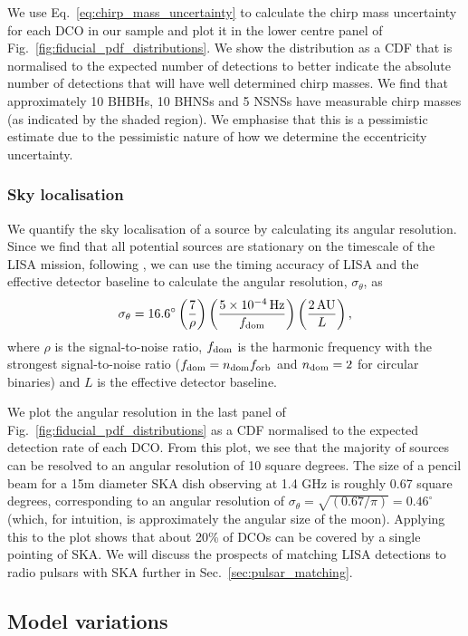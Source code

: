 We use Eq.~\ref{eq:chirp_mass_uncertainty} to calculate the chirp mass uncertainty for each DCO in our sample and plot it in the lower centre panel of Fig.~\ref{fig:fiducial_pdf_distributions}. We show the distribution as a CDF that is normalised to the expected number of detections to better indicate the absolute number of detections that will have well determined chirp masses. We find that approximately 10 BHBHs, 10 BHNSs and 5 NSNSs have measurable chirp masses (as indicated by the shaded region). We emphasise that this is a pessimistic estimate due to the pessimistic nature of how we determine the eccentricity uncertainty.

\subsubsection{Sky localisation}
We quantify the sky localisation of a source by calculating its angular resolution. Since we find that all potential sources are stationary on the timescale of the LISA mission, following \citet{Mandel+2018}, we can use the timing accuracy of LISA and the effective detector baseline to calculate the angular resolution, $\sigma_{\theta}$, as
\begin{equation}
    \sigma_{\theta} = 16.6^\circ \left(\frac{7}{\rho}\right) \left(\frac{5 \times 10^{-4} \unit{Hz}}{f_{\rm dom}}\right) \left( \frac{2 \unit{AU}}{L} \right),
\end{equation}
where $\rho$ is the signal-to-noise ratio, $f_{\rm dom}$ is the harmonic frequency with the strongest signal-to-noise ratio ($f_{\rm dom} = n_{\rm dom} f_{\rm orb}$ and $n_{\rm dom} = 2$ for circular binaries) and $L$ is the effective detector baseline.

We plot the angular resolution in the last panel of Fig.~\ref{fig:fiducial_pdf_distributions} as a CDF normalised to the expected detection rate of each DCO. From this plot, we see that the majority of sources can be resolved to an angular resolution of 10 square degrees. The size of a pencil beam for a 15m diameter SKA dish observing at 1.4 GHz is roughly 0.67 square degrees, corresponding to an angular resolution of $\sigma_\theta = \sqrt{(0.67 / \pi)} = 0.46^\circ$ (which, for intuition, is approximately the angular size of the moon). Applying this to the plot shows that about 20\% of DCOs can be covered by a single pointing of SKA. We will discuss the prospects of matching LISA detections to radio pulsars with SKA further in Sec.~\ref{sec:pulsar_matching}.

\subsection{Model variations}
